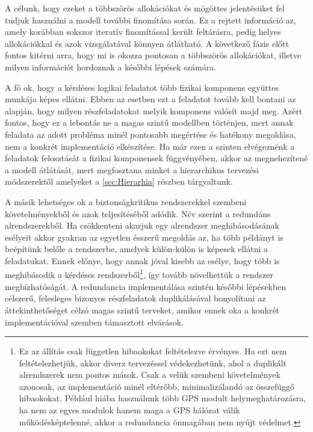         A célunk, hogy ezeket a többszörös allokációkat és mögöttes jelentésüket fel tudjuk használni a modell további finomítása során. Ez a rejtett információ az, amely korábban sokszor iteratív finomítással került feltárásra, pedig helyes allokációkkal és azok vizsgálatával könnyen átlátható.
        A következő fázis előtt fontos kitérni arra, hogy mi is okozza pontosan a többszörös allokációkat, illetve milyen információt hordoznak a későbbi lépések számára.
        
        A fő ok, hogy a kérdéses logikai feladatot több fizikai komponens együttes munkája képes ellátni. Ebben az esetben ezt a feladatot tovább kell bontani az alapján, hogy milyen részfeladatokat melyik komponens valósít majd meg.
        Azért fontos, hogy ez a lebontás ne a magas szintű modellben történjen, mert annak feladata az adott probléma minél pontosabb megértése és hatékony megoldása, nem a konkrét implementáció elkészítése.
        Ha már ezen a szinten elvégeznénk a feladatok felosztását a fizikai komponensek függvényében, akkor az megnehezítené a modell átlátását, mert megfosztana minket a hierarchikus tervezési módszerektől amelyeket a \ref{sec:Hierarhia} részben tárgyaltunk.
        
        A másik lehetséges ok a biztonságkritikus rendszerekkel szembeni követelményekből és azok teljesítéséből adódik. Név szerint a redundáns alrendszerekből. Ha csökkenteni akarjuk egy alrendszer meghibásodásának esélyeit akkor gyakran az egyetlen ésszerű megoldás az, ha több példányt is beépítünk belőle a rendszerbe, amelyek külön-külön is képesek ellátni a feladatukat.
        Ennek előnye, hogy annak jóval kisebb az esélye, hogy több is meghibásodik a kérdéses rendszerből\footnote{Ez az állítás csak független hibaokokat feltételezve érvényes. Ha ezt nem feltételezhetjük, akkor diverz tervezéssel védekezhetünk, ahol a duplikált alrendszerek nem pontos mások. Csak a velük szembeni követelmények azonosak, az implementáció minél eltérőbb, minimalizálandó az összefüggő hibaokokat. Például hiába használunk több GPS modult helymeghatározásra, ha nem az egyes modulok hanem maga a GPS hálózat válik működésképtelenné, akkor a redundancia önmagában nem nyújt védelmet.}, így tovább növelhettük a rendszer megbízhatóságát.
        A redundancia implementálása szintén későbbi lépésekben célszerű, felesleges bizonyos részfeladatok duplikálásával bonyolítani az áttekinthetőséget célzó magas szintű terveket, amikor ennek oka a konkrét implementációval szemben támasztott elvárások.

